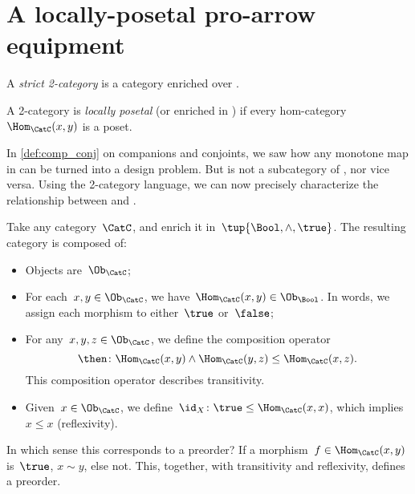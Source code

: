 

\section{A locally-posetal pro-arrow equipment}

\begin{definition}[2-category]
  A \emph{strict 2-category} is a category enriched over \Category.
\end{definition}

\begin{definition}
  \label{def:locallyposetalcat}
  A 2-category \CatC is \emph{locally posetal} (or enriched in \Pos) if every hom-category~$\Hom_{\CatC}(x,y)$ is a poset.
\end{definition}
In \cref{def:comp_conj} on companions and conjoints, we saw how any monotone map in \Pos can be turned into a design problem. But \DP is not a subcategory of \Pos, nor vice versa. Using the 2-category language, we can now precisely characterize the relationship between \Pos and \DP. %

\begin{example}
  Take any category~$\CatC$, and enrich it in~$\tup{\Bool,\wedge,\true}$. The resulting category is composed of:
  \begin{itemize}
    \item Objects are~$\Ob_\CatC$;
    \item For each~$x,y\in \Ob_\CatC$, we have~$\Hom_\CatC(x,y)\in \Ob_\Bool$. In words, we assign each morphism to either~$\true$ or~$\false$;
    \item For any~$x,y,z\in \Ob_\CatC$, we define the composition operator
    \begin{equation*}
      \then \colon \Hom_\CatC(x,y)\wedge \Hom_\CatC(y,z)\leq \Hom_\CatC(x,z).
    \end{equation*}
    This composition operator describes transitivity.
    \item Given~$x\in \Ob_\CatC$, we define~$\id_X\colon \true \leq \Hom_\CatC(x,x)$, which implies~$x\leq x$ (reflexivity).
  \end{itemize}
  In which sense this corresponds to a preorder? If a morphism~$f\in \Hom_\CatC(x,y)$ is~$\true$, $x\sim y$, else not. This, together, with transitivity and reflexivity, defines a preorder.
\end{example}

